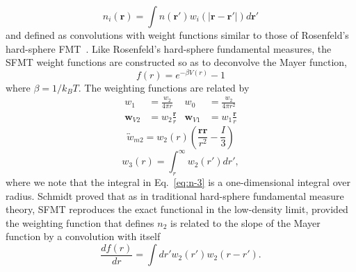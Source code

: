 \documentclass[letterpaper,twocolumn,amsmath,amssymb,prb]{revtex4-1}
\begin{document}
\begin{equation}
  n_{i}(\textbf{r}) = \int
  n(\textbf{r}')w_i(|\textbf{r}-\textbf{r}'|) d\textbf{r}'
  \label{eq:n-convolution}
\end{equation}
and defined as convolutions with weight 
functions similar to those of 
Rosenfeld's hard-sphere FMT~\cite{rosenfeld1989}. 
Like Rosenfeld's hard-sphere fundamental measures, the SFMT weight
functions are constructed so as to deconvolve the Mayer function,
\begin{equation}
  f(r) = e^{-\beta V(r)} - 1
  \label{eq:Mayerfunction}
\end{equation}
where $\beta = 1/k_BT$. %
The weighting functions are related by
\begin{align}
  w_1 &= \frac{w_2}{4\pi r} &
  w_0 &= \frac{w_2}{4\pi r^2}
  \label{eq:n-0-1}
  \\
  \mathbf{w}_{V2} &= w_2\frac{\textbf{r}}{r} &
  \mathbf{w}_{V1} &= w_1\frac{\textbf{r}}{r}
  \label{eq:n-vectors}
\end{align}
\begin{equation}
  \overleftrightarrow{w}_{m2} = w_2(r)\left(\frac{\mathbf{rr}}{r^2}-\frac{I}{3}\right)
  \label{eq:n-tensor}
\end{equation}
\begin{equation}
   w_3(r) = \int_{r}^{\infty} w_2(r') dr',
  \label{eq:n-3}
\end{equation}
where we note that the integral in Eq.~\ref{eq:n-3} is a
one-dimensional integral over radius. Schmidt proved that as in traditional 
hard-sphere fundamental measure theory, 
SFMT reproduces the exact functional in the low-density limit, provided the 
weighting function that defines $n_2$ is related to the slope of the Mayer 
function by a convolution with itself
\begin{equation}\label{eq:mayerandw2}
  \frac{d f(r)}{dr} = \int dr' w_2(r') w_2 (r-r').
\end{equation}
\end{document}
